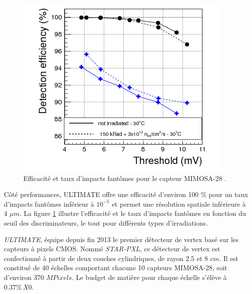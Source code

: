    
  \begin{figure}[!htb]
    \begin{center}
      \includegraphics[scale=0.55]{./figures/m28_3colorsPlot_compareIrrad_BW.png}
      \caption{Efficacit\'e et taux d'impacts fant\^omes pour le capteur MIMOSA-28 \cite{Baudot:2013pc}.}
      \label{fig:caract_mi28_20}
    \end{center}
  \end{figure}
  
  \medskip
  
   Côt\'e performances, ULTIMATE offre une efficacit\'e d'environ 100 $\%$ pour un taux d'impacts fant\^omes inf\'erieur \`a $10^{-5}$ et permet une r\'esolution spatiale inf\'erieure \`a 4 $\mu m$. La figure \ref{fig:caract_mi28_20} illustre l'efficacit\'e et le taux d'impacts fant\^omes en fonction du seuil des discriminateurs, le tout pour diff\'erents types d'irradiations.
  
  \medskip
  
   \textit{ULTIMATE}, \'equipe depuis fin 2013 le premier d\'etecteur de vertex bas\'e sur les capteurs \`a pixels CMOS. Nomm\'e \textit{STAR-PXL}, ce d\'etecteur de vertex est confectionn\'e \`a partir de deux couches cylindriques, de rayon $2.5$ et $8$ $cm$. Il est constitu\'e de 40 \'echelles comportant chacune 10 capteurs MIMOSA-28, soit d'environ 370 $MPixels$. Le budget de mati\`ere pour chaque \'echelle s'\'el\`eve \`a $0.37\% \, X0$.
   
